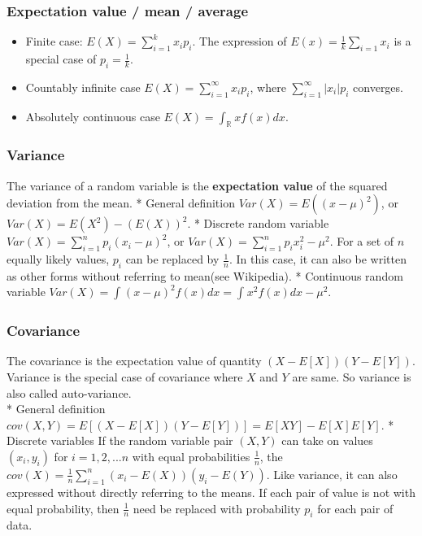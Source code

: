 \documentclass[11pt]{article}
\providecommand{\tightlist}{%
      \setlength{\itemsep}{0pt}\setlength{\parskip}{0pt}}
\begin{document}
    \subsubsection{Expectation value / mean /
average}\label{expectation-value-mean-average}

\begin{itemize}
\tightlist
\item
  Finite case: \(E(X) = \sum_{i=1}^kx_ip_i\). The expression of
  \(E(x) = \frac{1}{k}\sum_{i=1}{x_i}\) is a special case of
  \(p_i = \frac{1}{k}\).
\item
  Countably infinite case \(E(X) = \sum_{i=1}^{\infty}x_ip_i\), where
  \(\sum_{i=1}^{\infty}|x_i|p_i\) converges.
\item
  Absolutely continuous case \(E(X) = \int_{\mathbb{R}^{}}xf(x)dx\).
\end{itemize}

    \subsubsection{Variance}\label{variance}

The variance of a random variable is the \textbf{expectation value} of
the squared deviation from the mean. * General definition
\(Var(X) = E((x-\mu)^2)\), or \(Var(X) =E(X^2)-(E(X))^2\). * Discrete
random variable \(Var(X) = \sum_{i=1}^np_i(x_i-\mu)^2\), or
\(Var(X) = \sum_{i=1}^np_ix_i^2 - \mu^2\). For a set of \(n\) equally
likely values, \(p_i\) can be replaced by \(\frac{1}{n}\). In this case,
it can also be written as other forms without referring to mean(see
Wikipedia). * Continuous random variable
\(Var(X) = \int_{}^{}(x-\mu)^2f(x)dx = \int_{}^{}x^2f(x)dx -\mu^2\).

    \subsubsection{Covariance}\label{covariance}

The covariance is the expectation value of quantity
\((X-E[X])(Y-E[Y])\). Variance is the special case of covariance where
\(X\) and \(Y\) are same. So variance is also called auto-variance.\\
* General definition
\(cov(X,Y) = E[(X-E[X])(Y-E[Y])] = E[XY] - E[X]E[Y]\). * Discrete
variables If the random variable pair \((X,Y)\) can take on values
\((x_i,y_i)\) for \(i = 1,2,...n\) with equal probabilities
\(\frac{1}{n}\), the
\(cov(X) = \frac{1}{n}\sum_{i=1}^n(x_i-E(X))(y_i-E(Y))\). Like variance,
it can also expressed without directly referring to the means. If each
pair of value is not with equal probability, then \(\frac{1}{n}\) need
be replaced with probability \(p_i\) for each pair of data.
\end{document}

